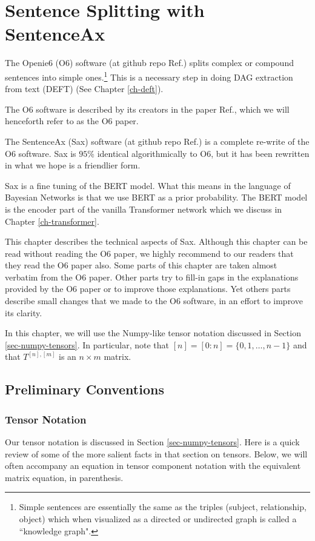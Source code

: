 \chapter{Sentence Splitting with SentenceAx}
\label{ch-sentence-ax}

The Openie6 (O6) software
(at github repo Ref.\cite{openie6-github})
splits complex or compound 
sentences into
simple ones.\footnote{Simple sentences are essentially
the same  as the triples (subject, relationship, object) which when visualized as a directed or undirected graph
is called a  ``knowledge graph".} This is a necessary step in doing 
DAG extraction from text (DEFT) (See Chapter \ref{ch-deft}).

The O6 software is described by its creators
 in the paper Ref.\cite{openie6-paper},
 which we will henceforth refer to as 
 the O6 paper.

The SentenceAx (Sax) software (at github repo Ref.\cite{sentence-ax-github}) is a complete re-write of 
the  O6 software.
Sax is $95\%$ identical algorithmically to O6, but it has been rewritten in what we hope is a friendlier form.
 

 Sax is a fine tuning of the BERT model.
 What this means in the
 language of Bayesian
 Networks is that we use
 BERT as a prior
 probability.
 The BERT model is the encoder part of the
 vanilla Transformer network which
 we discuss in Chapter \ref{ch-transformer}.

 This chapter describes the technical
 aspects of Sax. Although this chapter
 can be read without reading the O6 paper, we highly recommend to
 our readers that they read the O6 paper also.
 Some parts of this chapter are taken almost verbatim
 from the O6 paper. Other parts try to fill-in gaps in the
 explanations provided by the O6 paper or to improve those explanations. Yet others parts describe small changes that we made to the O6 software, in an effort to improve its clarity.




 In this chapter, we
 will use the Numpy-like tensor notation
 discussed in Section
 \ref{sec-numpy-tensors}. In particular, note that $[n] = [0:n] = \{0, 1,\ldots, n-1\}$ and that $T^{[n], [m]}$ is an $n\times m$ matrix.

\section{Preliminary Conventions}

\subsection{Tensor Notation}
Our tensor notation is discussed in Section
\ref{sec-numpy-tensors}.
Here is a quick review
of some of the more salient
facts in that section on tensors.
Below, we will often accompany
  an equation in tensor
  component notation
  with the equivalent matrix equation,
  in parenthesis.
  
